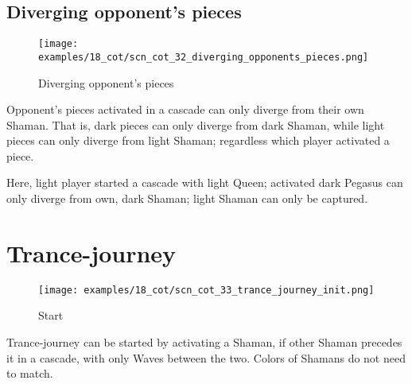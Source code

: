 \subsection*{Diverging opponent's pieces}
\label{sec:Conquest of Tlalocan/Divergence/Diverging opponent's pieces}

\vspace*{-1.4\baselineskip}
\noindent
\begin{figure}[!h]
\texttt{[image: examples/18\_cot/scn\_cot\_32\_diverging\_opponents\_pieces.png]}
\vspace*{-1.3\baselineskip}
\caption{Diverging opponent's pieces}
\label{fig:scn_cot_32_diverging_opponents_pieces}
\end{figure}

\vspace*{-0.5\baselineskip}
Opponent's pieces activated in a cascade can only diverge from their own Shaman.
That is, dark pieces can only diverge from dark Shaman, while light pieces can only
diverge from light Shaman; regardless which player activated a piece.

Here, light player started a cascade with light Queen; activated dark Pegasus
can only diverge from own, dark Shaman; light Shaman can only be captured.

\clearpage %

\section*{Trance-journey}
\label{sec:Conquest of Tlalocan/Trance-journey}

\noindent
\begin{wrapfigure}[13]{l}{0.4\textwidth}
\centering
\texttt{[image: examples/18\_cot/scn\_cot\_33\_trance\_journey\_init.png]}
\caption{Start}
\label{fig:scn_cot_33_trance_journey_init}
\end{wrapfigure}
Trance-journey can be started by activating a Shaman, if other Shaman precedes
it in a cascade, with only Waves between the two. Colors of Shamans do not need
to match.

